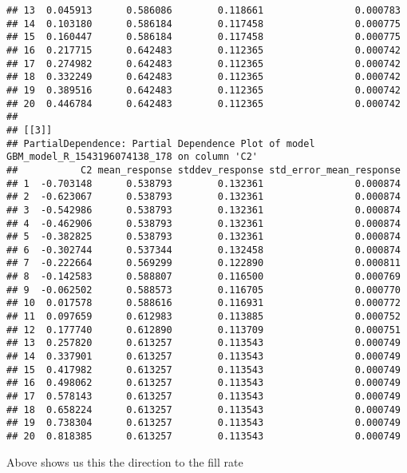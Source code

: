 \documentclass[]{article}
\newenvironment{Shaded}{\begin{snugshade}}{\end{snugshade}}
\newcommand{\KeywordTok}[1]{\textcolor[rgb]{0.13,0.29,0.53}{\textbf{{#1}}}}
\newcommand{\StringTok}[1]{\textcolor[rgb]{0.31,0.60,0.02}{{#1}}}
\newcommand{\CommentTok}[1]{\textcolor[rgb]{0.56,0.35,0.01}{\textit{{#1}}}}
\newcommand{\NormalTok}[1]{{#1}}
\begin{document}
\begin{verbatim}
## 13  0.045913      0.586086        0.118661                0.000783
## 14  0.103180      0.586184        0.117458                0.000775
## 15  0.160447      0.586184        0.117458                0.000775
## 16  0.217715      0.642483        0.112365                0.000742
## 17  0.274982      0.642483        0.112365                0.000742
## 18  0.332249      0.642483        0.112365                0.000742
## 19  0.389516      0.642483        0.112365                0.000742
## 20  0.446784      0.642483        0.112365                0.000742
## 
## [[3]]
## PartialDependence: Partial Dependence Plot of model GBM_model_R_1543196074138_178 on column 'C2'
##           C2 mean_response stddev_response std_error_mean_response
## 1  -0.703148      0.538793        0.132361                0.000874
## 2  -0.623067      0.538793        0.132361                0.000874
## 3  -0.542986      0.538793        0.132361                0.000874
## 4  -0.462906      0.538793        0.132361                0.000874
## 5  -0.382825      0.538793        0.132361                0.000874
## 6  -0.302744      0.537344        0.132458                0.000874
## 7  -0.222664      0.569299        0.122890                0.000811
## 8  -0.142583      0.588807        0.116500                0.000769
## 9  -0.062502      0.588573        0.116705                0.000770
## 10  0.017578      0.588616        0.116931                0.000772
## 11  0.097659      0.612983        0.113885                0.000752
## 12  0.177740      0.612890        0.113709                0.000751
## 13  0.257820      0.613257        0.113543                0.000749
## 14  0.337901      0.613257        0.113543                0.000749
## 15  0.417982      0.613257        0.113543                0.000749
## 16  0.498062      0.613257        0.113543                0.000749
## 17  0.578143      0.613257        0.113543                0.000749
## 18  0.658224      0.613257        0.113543                0.000749
## 19  0.738304      0.613257        0.113543                0.000749
## 20  0.818385      0.613257        0.113543                0.000749
\end{verbatim}

Above shows us this the direction to the fill rate

\begin{Shaded}
\end{Shaded}
\end{document}
